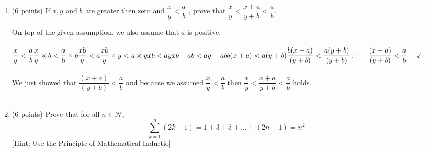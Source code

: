 \documentclass[fleqn]{article}
\begin{document}
  \begin{enumerate}
    \item (6 points)  If $x, y$ and $b$ are greater then zero and $\dfrac{x}{y}<\dfrac{a}{b}$
    , prove that $\dfrac{x}{y} < \dfrac{x+a}{y+b} < \dfrac{a}{b}$.

      \textcolor{hwColor}{
        On top of the given assumption, we also assume that $a$ is positive.
        \\
        \\
        $
          \dfrac{x}{y} < \dfrac{a}{b}
          \\
          \\
          \dfrac{x}{y} \times b < \dfrac{a}{b} \times b
          \\
          \\
          \dfrac{xb}{y} < a
          \\
          \\
          \dfrac{xb}{y} \times y < a \times y
          \\
          \\
          xb < ay 
          \\
          \\
          xb+ab < ay+ab
          \\
          \\
          b(x+a) < a(y+b)
          \\
          \\
          \dfrac{b(x+a)}{(y+b)} < \dfrac{a(y+b)}{(y+b)}
          \\
          \\
          \\
          \therefore ~~~~ \dfrac{(x+a)}{(y+b)} < \dfrac{a}{b} ~~~~ \checkmark
        $
        \\
        \\
        We just showed that $\dfrac{(x+a)}{(y+b)} < \dfrac{a}{b}$ and because we assumed $\dfrac{x}{y}<\dfrac{a}{b}$ then 
        $\dfrac{x}{y} < \dfrac{x+a}{y+b} < \dfrac{a}{b}$ holds.
        \\
        \\
      }

    \item (6 points) Prove that for all $n \in \mathcal{N}$,
    $$
      \sum\limits_{k=1}^{n} (2k-1)=1+3+5+...+(2n-1)=n^2
    $$
    [Hint: Use the Principle of Mathematical Inductio]


\end{enumerate}
\end{document}
